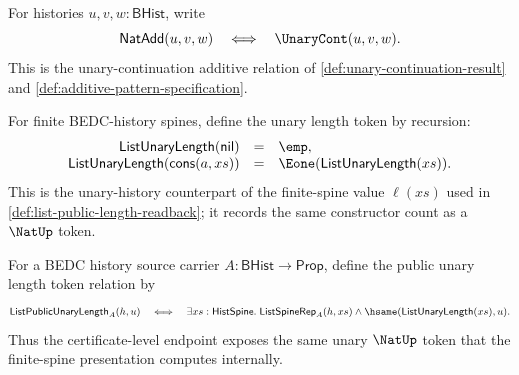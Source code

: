 \begin{definition}
\label{def:unary-natadd-relation}
For histories $u,v,w:\mathsf{BHist}$, write
$$
\mathsf{NatAdd}(u,v,w)
\quad\Longleftrightarrow\quad
\UnaryCont(u,v,w).
$$
This is the unary-continuation additive relation of \autoref{def:unary-continuation-result} and \autoref{def:additive-pattern-specification}.
\end{definition}

\begin{definition}
\label{def:list-unary-length-token}
For finite BEDC-history spines, define the unary length token by recursion:
$$
\begin{array}{rcl}
\mathsf{ListUnaryLength}(\mathsf{nil}) &=& \emp,\\
\mathsf{ListUnaryLength}(\mathsf{cons}(a,xs)) &=& \Eone(\mathsf{ListUnaryLength}(xs)).
\end{array}
$$
This is the unary-history counterpart of the finite-spine value $\ell(xs)$ used in \autoref{def:list-public-length-readback}; it records the same constructor count as a $\NatUp$ token.
\end{definition}

\begin{definition}
\label{def:list-public-unary-length-token}
For a BEDC history source carrier $A:\mathsf{BHist}\to\mathsf{Prop}$, define
the public unary length token relation by
$$
\mathsf{ListPublicUnaryLength}_A(h,u)
\quad\Longleftrightarrow\quad
\exists xs:\mathsf{HistSpine}.\;
\mathsf{ListSpineRep}_A(h,xs)\land
\hsame(\mathsf{ListUnaryLength}(xs),u).
$$
Thus the certificate-level endpoint exposes the same unary $\NatUp$ token that
the finite-spine presentation computes internally.
\end{definition}

